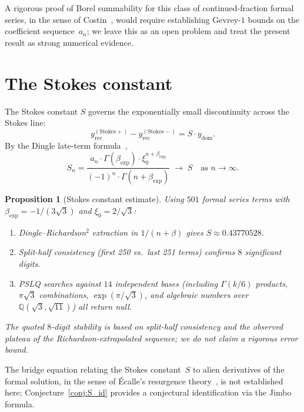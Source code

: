 \documentclass[11pt,a4paper]{article}
\newtheorem{proposition}[theorem]{Proposition}
\theoremstyle{definition}
\theoremstyle{remark}
\newcommand{\Q}{\mathbb{Q}}
\begin{document}
A rigorous proof of Borel summability for this class of
continued-fraction formal series, in the sense of
Costin~\cite{costin1998}, would require establishing
Gevrey-$1$ bounds on the coefficient sequence~$a_n$;
we leave this as an open problem and treat the present
result as strong numerical evidence.


\section{The Stokes constant}
\label{sec:stokes}

The Stokes constant $S$ governs the
exponentially small discontinuity across
the Stokes line:
\[
  y_{\mathrm{rec}}^{(\text{Stokes}+)}
  - y_{\mathrm{rec}}^{(\text{Stokes}-)}
  = S \cdot y_{\mathrm{dom}}.
\]
By the Dingle late-term
formula~\cite{dingle1973},
\begin{equation}\label{eq:dingle}
  S_n = \frac{a_n \cdot \Gamma(\beta_{\mathrm{exp}})
  \cdot \xi_0^{n+\beta_{\mathrm{exp}}}}
  {(-1)^n \cdot \Gamma(n+\beta_{\mathrm{exp}})}
  \;\longrightarrow\; S
  \quad\text{as } n\to\infty.
\end{equation}

\begin{proposition}[Stokes constant estimate]
\label{prop:stokes}
Using $501$ formal series terms with
$\beta_{\mathrm{exp}} = -1/(3\sqrt{3})$ and
$\xi_0 = 2/\sqrt{3}$:
\begin{enumerate}
\item[\textup{(i)}]
  Dingle--Richardson${}^2$ extraction in
  $1/(n+\beta)$ gives
  $S \approx 0.43770528$.
\item[\textup{(ii)}]
  Split-half consistency (first 250 vs.\
  last 251 terms) confirms $8$ significant
  digits.
\item[\textup{(iii)}]
  PSLQ searches against $14$ independent
  bases (including $\Gamma(k/6)$ products,
  $\pi\sqrt{3}$ combinations, $\exp(\pi/\sqrt{3})$,
  and algebraic numbers over
  $\Q(\sqrt{3},\sqrt{11})$) all return null.
\end{enumerate}
The quoted $8$-digit stability is based on
split-half consistency and the observed plateau
of the Richardson-extrapolated sequence; we do
not claim a rigorous error bound.
\end{proposition}

The bridge equation relating the Stokes constant~$S$ to
alien derivatives of the formal solution, in the sense of
\'Ecalle's resurgence theory~\cite{ecalle1981}, is not
established here; Conjecture~\ref{conj:S_id} provides
a conjectural identification via the Jimbo~\cite{Jimbo1982}
formula.
\end{document}
